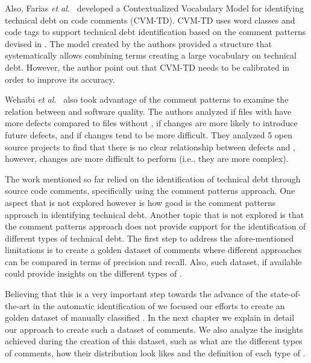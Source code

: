 Also, Farias \textit{et al.}~\cite{Farias2015MTD} developed a Contextualized Vocabulary Model for identifying technical debt on code comments (CVM-TD). CVM-TD uses word classes and code tags to support technical debt identification based on the comment patterns devised in \cite{Potdar2014ICSME}. The model created by the authors provided a structure that systematically allows combining terms creating a large vocabulary on technical debt. However, the author point out that  CVM-TD needs to be calibrated in order to improve its accuracy. 

Wehaibi \textit{et al.}~\cite{wehaibi2016SANER} also took advantage of the comment patterns to examine the relation between \SATD and software quality. The authors analyzed if files with \SATD have more defects compared to files without \SATD, if \SATD changes are more likely to introduce future defects, and if \SATD changes tend to be more difficult. They analyzed 5 open source projects to find that there is no clear relationship between defects and \SATD, however, \SATD changes are more difficult to perform (i.e., they are more complex).

The work mentioned so far relied on the identification of technical debt through source code comments, specifically using the comment patterns approach. One aspect that is not explored however is how good is the comment patterns approach in identifying technical debt. Another topic that is not explored is that the comment patterns approach does not provide support for the identification of different types of technical debt. The first step to address the afore-mentioned limitations is to create a golden dataset of \SATD comments where different approaches can be compared in terms of precision and recall. Also, such dataset, if available could provide insights on the different types of \SATD. 

Believing that this is a very important step towards the advance of the state-of-the-art in the automatic identification of \SATD we focused our efforts to create an golden dataset of manually classified \SATD. In the next chapter we explain in detail our approach to create such a dataset of \SATD comments. We also analyze the insights achieved during the creation of this dataset, such as what are the different types of \SATD comments, how their distribution look likes and the definition of each type of \SATD.  